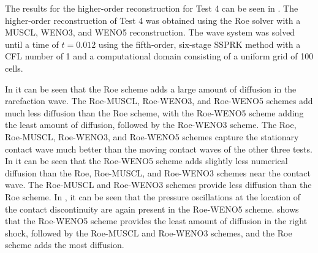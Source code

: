 The results for the higher-order reconstruction for Test 4 can be seen in .  The higher-order reconstruction of Test 4 was obtained using the Roe solver with a MUSCL, WENO3, and WENO5 reconstruction. The wave system was solved until a time of $t=0.012$ using the fifth-order, six-stage SSPRK method with a CFL number of 1 and a computational domain consisting of a uniform grid of 100 cells.

In  it can be seen that the Roe scheme adds a large amount of diffusion in the rarefaction wave. The Roe-MUSCL, Roe-WENO3, and Roe-WENO5 schemes add much less diffusion than the Roe scheme, with the Roe-WENO5 scheme adding the least amount of diffusion, followed by the Roe-WENO3 scheme. The Roe, Roe-MUSCL, Roe-WENO3, and Roe-WENO5 schemes capture the stationary contact wave much better than the moving contact waves of the other three tests. In  it can be seen that the Roe-WENO5 scheme adds slightly less numerical diffusion than the Roe, Roe-MUSCL, and Roe-WENO3 schemes near the contact wave. The Roe-MUSCL and Roe-WENO3 schemes provide less diffusion than the Roe scheme. In , it can be seen that the pressure oscillations at the location of the contact discontinuity are again present in the Roe-WENO5 scheme.  shows that the Roe-WENO5 scheme provides the least amount of diffusion in the right shock, followed by the Roe-MUSCL and Roe-WENO3 schemes, and the Roe scheme adds the most diffusion.
